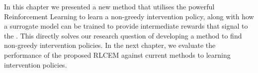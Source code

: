 In this chapter we presented a new method 
that utilises the powerful Reinforcement Learning
to learn a non-greedy intervention policy,
along with how a surrogate model can be trained to 
provide intermediate rewards that signal to the .
This directly solves our research question of 
developing a method to find non-greedy intervention policies.
In the next chapter, we evaluate the performance of the proposed
RLCEM against current methods to learning
intervention policies.


